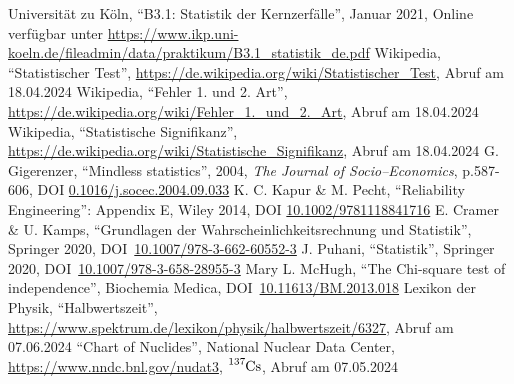 \documentclass[12pt,a4paper]{scrartcl}
\numberwithin{equation}{section} %
\renewcommand{\[}{} %
\renewcommand{\]}{\noindent} %
\begin{document}
\begin{thebibliography}{99}
	Universität zu Köln, ``B3.1: Statistik der Kernzerfälle'', Januar
	2021, Online verfügbar unter
	\url{https://www.ikp.uni-koeln.de/fileadmin/data/praktikum/B3.1_statistik_de.pdf}
	Wikipedia, ``Statistischer Test'',
	\url{https://de.wikipedia.org/wiki/Statistischer_Test}, Abruf am
	18.04.2024
	Wikipedia, ``Fehler 1. und 2. Art'',
	\url{https://de.wikipedia.org/wiki/Fehler_1._und_2._Art}, Abruf am
	18.04.2024
	Wikipedia, ``Statistische Signifikanz'',
	\url{https://de.wikipedia.org/wiki/Statistische_Signifikanz}, Abruf am
	18.04.2024
	G. Gigerenzer, ``Mindless statistics'', 2004, \emph{The Journal of
	Socio--Economics}, p.587-606, DOI
	\href{https://doi.org/10.1016/j.socec.2004.09.033}{0.1016/j.socec.2004.09.033}
	K. C. Kapur \& M. Pecht, ``Reliability Engineering'': Appendix E,
	Wiley 2014, DOI
	\href{https://doi.org/10.1002/9781118841716}{10.1002/9781118841716}
	E. Cramer \& U. Kamps, ``Grundlagen der Wahrscheinlichkeitsrechnung
	und Statistik'', Springer 2020, DOI~\href{https://doi.org/10.1007/978-3-662-60552-3}{10.1007/978-3-662-60552-3}
	J. Puhani, ``Statistik'', Springer 2020, DOI~\href{https://doi.org/10.1007/978-3-658-28955-3}{10.1007/978-3-658-28955-3}
	Mary L. McHugh, ``The Chi-square test of independence'', Biochemia Medica, DOI~\href{https://doi.org/10.11613/BM.2013.018}{10.11613/BM.2013.018}
	Lexikon der Physik, ``Halbwertszeit'', \url{https://www.spektrum.de/lexikon/physik/halbwertszeit/6327}, Abruf am 07.06.2024
	``Chart of Nuclides'', National Nuclear Data Center,
	\url{https://www.nndc.bnl.gov/nudat3}, $\ce{^{137}Cs}$,
	Abruf am 07.05.2024
\end{thebibliography}
\end{document}

